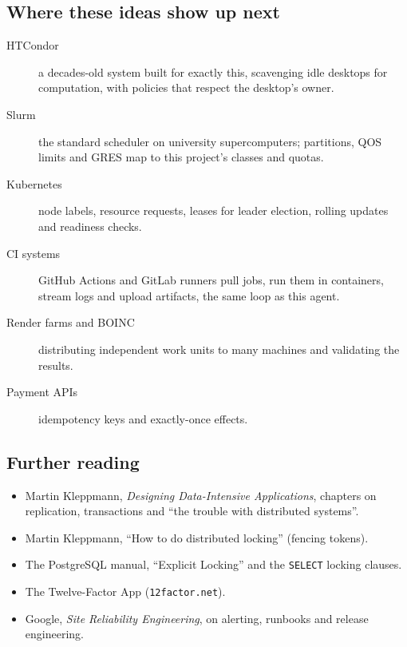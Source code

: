 \subsection{Where these ideas show up next}

\begin{description}
\item[HTCondor] a decades-old system built for exactly this, scavenging idle
  desktops for computation, with policies that respect the desktop's owner.
\item[Slurm] the standard scheduler on university supercomputers; partitions,
  QOS limits and GRES map to this project's classes and quotas.
\item[Kubernetes] node labels, resource requests, leases for leader election,
  rolling updates and readiness checks.
\item[CI systems] GitHub Actions and GitLab runners pull jobs, run them in
  containers, stream logs and upload artifacts, the same loop as this agent.
\item[Render farms and BOINC] distributing independent work units to many
  machines and validating the results.
\item[Payment APIs] idempotency keys and exactly-once effects.
\end{description}

\subsection{Further reading}

\begin{itemize}
\item Martin Kleppmann, \emph{Designing Data-Intensive Applications}, chapters
  on replication, transactions and ``the trouble with distributed systems''.
\item Martin Kleppmann, ``How to do distributed locking'' (fencing tokens).
\item The PostgreSQL manual, ``Explicit Locking'' and the \texttt{SELECT}
  locking clauses.
\item The Twelve-Factor App (\texttt{12factor.net}).
\item Google, \emph{Site Reliability Engineering}, on alerting, runbooks and
  release engineering.
\end{itemize}
